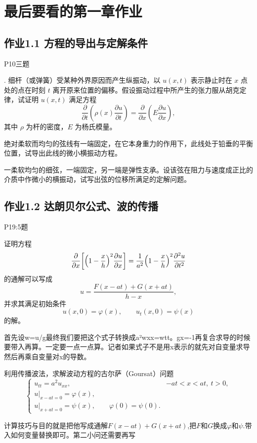 \chapter{最后要看的第一章作业}

\section{作业1.1 方程的导出与定解条件}
P10三题
\begin{homework}
[1]. 细杆（或弹簧）受某种外界原因而产生纵振动，以 $u(x,t)$ 表示静止时在 $x$ 点处的点在时刻 $t$ 离开原来位置的偏移。假设振动过程中所产生的张力服从胡克定律，试证明 $u(x,t)$ 满足方程
\[
\frac{\partial}{\partial t}\left(\rho(x)\frac{\partial u}{\partial t}\right)
= \frac{\partial}{\partial x}\left(E\frac{\partial u}{\partial x}\right),
\]
其中 $\rho$ 为杆的密度，$E$ 为杨氏模量。
\end{homework}

\begin{homework}
[6] 绝对柔软而均匀的弦线有一端固定，在它本身重力的作用下，此线处于铅垂的平衡位置，试导出此线的微小横振动方程。
\end{homework}

\begin{homework}
[7] 一柔软均匀的细弦，一端固定，另一端是弹性支承。设该弦在阻力与速度成正比的介质中作微小的横振动，试写出弦的位移所满足的定解问题。
\end{homework}



\section{作业1.2 达朗贝尔公式、波的传播}
P19:5题
\begin{homework}[1]
证明方程
\[
\frac{\partial}{\partial x}\!\left[\Bigl(1-\frac{x}{h}\Bigr)^{2}\frac{\partial u}{\partial x}\right]
= \frac{1}{a^{2}}\Bigl(1-\frac{x}{h}\Bigr)^{2}\frac{\partial^{2}u}{\partial t^{2}}
\]
的通解可以写成
\[
u = \frac{F(x-at)+G(x+at)}{h-x},
\]
并求其满足初始条件
\[
u(x,0)=\varphi(x),\qquad u_t(x,0)=\psi(x)
\]
的解。
\end{homework}
\begin{dxtips}
    首先设w=u/g最终我们要把这个式子转换成a²wxx=wtt。gx=-1再复合求导的时候要带入再算。一定要一点一点算。记者如果式子不是用x表示的就先对自变量求导然后再乘自变量对x的导数。
\end{dxtips}
\begin{homework}
[3] 利用传播波法，求解波动方程的古尔萨（Goursat）问题
\[
\begin{cases}
u_{tt}=a^{2}u_{xx}, & -at<x<at,\ t>0,\\[4pt]
u|_{x-at=0}=\varphi(x),\\[4pt]
u|_{x+at=0}=\psi(x),\qquad \varphi(0)=\psi(0).
\end{cases}
\]
\end{homework}
\begin{dxtips}
    计算技巧与目的就是把他写成通解\(F(x-at)+G(x+at)\),把\(F\)和\(G\)换成\(\varphi\)和\(\psi\).带入如何变量替换即可。第二小问还需要再写
\end{dxtips}

